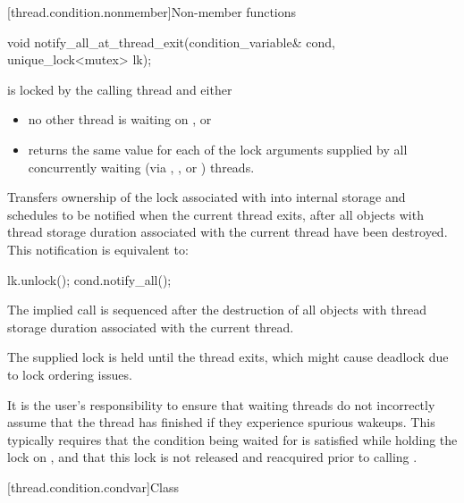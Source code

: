 [thread.condition.nonmember]{Non-member functions}
%
\begin{itemdecl}
void notify_all_at_thread_exit(condition_variable& cond, unique_lock<mutex> lk);
\end{itemdecl}

\begin{itemdescr}
\pnum
\expects
{} is locked by the calling thread and either
\begin{itemize}
\item no other thread is waiting on , or
\item {} returns the same value for each of the lock arguments
supplied by all concurrently waiting (via , ,
or ) threads.
\end{itemize}

\pnum
\effects
Transfers ownership of the lock associated with  into
internal storage and schedules  to be notified when the current
thread exits, after all objects with thread storage duration associated with
the current thread have been destroyed. This notification is equivalent to:
\begin{codeblock}
lk.unlock();
cond.notify_all();
\end{codeblock}

\pnum
\sync
The implied  call is sequenced after the destruction of
all objects with thread storage duration associated with the current thread.

\pnum
\begin{note}
The supplied lock is held until the thread exits,
which might cause deadlock due to lock ordering issues.
\end{note}

\pnum
\begin{note}
It is the user's responsibility to ensure that waiting threads
do not incorrectly assume that the thread has finished if they experience
spurious wakeups. This typically requires that the condition being waited
for is satisfied while holding the lock on , and that this lock
is not released and reacquired prior to calling .
\end{note}
\end{itemdescr}

[thread.condition.condvar]{Class }

